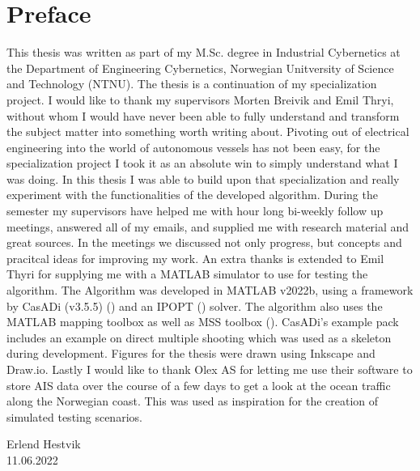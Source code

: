 \newpage

\section*{Preface}

This thesis was written as part of my M.Sc. degree in Industrial Cybernetics
at the Department of Engineering Cybernetics, Norwegian Unitversity of Science
and Technology (NTNU). The thesis is a continuation of my specialization project.
I would like to thank my supervisors Morten Breivik and Emil Thryi, without whom I would have
never been able to fully understand and transform the subject matter into something worth writing about.\newline
Pivoting out of electrical engineering into the world of autonomous vessels has not been easy, for
the specialization project I took it as an absolute win to simply understand what I was doing. In this 
thesis I was able to build upon that specialization and really experiment with the functionalities of the developed
algorithm.\newline
During the semester my supervisors have helped me with hour long bi-weekly follow up meetings, answered
all of my emails, and supplied me with research material and great sources. In the meetings we discussed
not only progress, but concepts and pracitcal ideas for improving my work.\newline
An extra thanks is extended to Emil Thyri for supplying me with a MATLAB simulator to use for testing the algorithm.
The Algorithm was developed in MATLAB v2022b, using a framework by CasADi (v3.5.5) (\cite{andersson2019casadi}) and an IPOPT (\cite{wachter2006implementation}) solver. The algorithm
also uses the MATLAB mapping toolbox as well as MSS toolbox (\cite{MSStoolbox}). CasADi's example pack includes an example on 
direct multiple shooting which was used as a skeleton during development. Figures for the thesis were drawn
using Inkscape and Draw.io. Lastly I would like to thank Olex AS for letting me use their software to store AIS data
over the course of a few days to get a look at the ocean traffic along the Norwegian coast. This was used as inspiration
for the creation of simulated testing scenarios.


\begin{center}
    Erlend Hestvik\\
    11.06.2022
\end{center}

\afterpage{\blankpage}